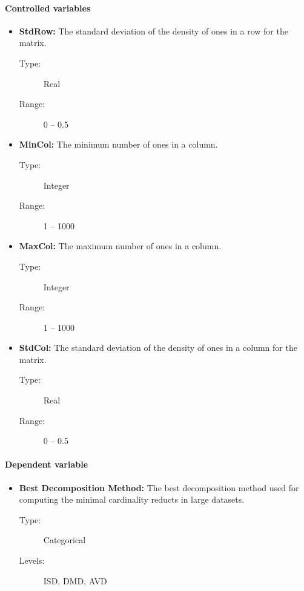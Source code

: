 \documentclass[11pt]{article}   %
\begin{document}
    \paragraph{Controlled variables}  
  	\begin{itemize}
  	   \item \textbf{StdRow:} The standard deviation of the density of ones in a row for the matrix.
  	   		\begin{description}
  	   			\item[Type:] Real
  	   			\item[Range:] 0 -- 0.5
  	   		\end{description}
  	   \item \textbf{MinCol:} The minimum number of ones in a column.
  	   		\begin{description}
  	   			\item[Type:] Integer
  	   			\item[Range:] 1 -- 1000
  	   		\end{description}
  	   \item \textbf{MaxCol:} The maximum number of ones in a column.
  	   		\begin{description}
  	   			\item[Type:] Integer
  	   			\item[Range:] 1 -- 1000
  	   		\end{description}
  	   \item \textbf{StdCol:} The standard deviation of the density of ones in a column for the matrix.
  	   		\begin{description}
  	   			\item[Type:] Real
  	   			\item[Range:] 0 -- 0.5
  	   		\end{description}
    \end{itemize}
    \paragraph{Dependent variable}  
  	\begin{itemize}
  	   \item \textbf{Best Decomposition Method:} The best decomposition method used for computing the minimal
  	   											cardinality	reducts in large datasets.
  	   		\begin{description}
  	   			\item[Type:] Categorical
  	   			\item[Levels:] ISD, DMD, AVD
  	   		\end{description}
    \end{itemize}
    
\end{document}
